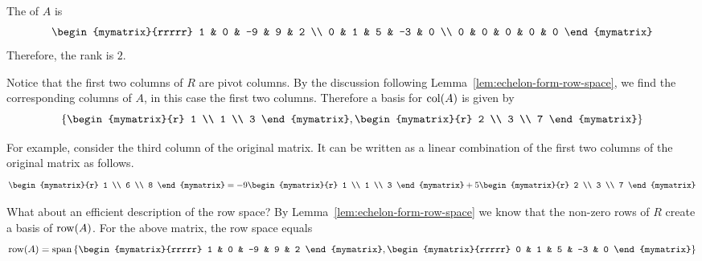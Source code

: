 \begin{solution}
  The {\rref} of $A$ is
  \begin{equation*}
    \begin{mymatrix}{rrrrr}
      1 & 0 & -9 & 9 & 2 \\
      0 & 1 & 5 & -3 & 0 \\
      0 & 0 & 0 & 0 & 0
    \end{mymatrix}
  \end{equation*}
  Therefore, the rank is $2$.

  Notice that the first two columns of $R$ are pivot columns. By the
  discussion following Lemma~\ref{lem:echelon-form-row-space}, we find
  the corresponding columns of $A$, in this case the first two
  columns. Therefore a basis for $\col(A)$ is given by
  \begin{equation*}
    \set{\begin{mymatrix}{r}
        1 \\
        1 \\
        3
      \end{mymatrix} , \begin{mymatrix}{r}
        2 \\
        3 \\
        7
      \end{mymatrix}
    }
  \end{equation*}

  For example, consider the third column of the original matrix. It
  can be written as a linear combination of the first two columns of
  the original matrix as follows.
  \begin{equation*}
    \begin{mymatrix}{r}
      1 \\
      6 \\
      8
    \end{mymatrix} =-9\begin{mymatrix}{r}
      1 \\
      1 \\
      3
    \end{mymatrix} +5\begin{mymatrix}{r}
      2 \\
      3 \\
      7
    \end{mymatrix}
  \end{equation*}

  What about an efficient description of the row space? By
  Lemma~\ref{lem:echelon-form-row-space} we know that the non-zero
  rows of $R$ create a basis of $\row(A)$.  For the above
  matrix, the row space equals
  \begin{equation*}
    \row(A) =
    \sspan \set{
      \begin{mymatrix}{rrrrr}
        1 & 0 & -9 & 9 & 2
      \end{mymatrix}, \begin{mymatrix}{rrrrr}
        0 & 1 & 5 & -3 & 0
      \end{mymatrix}
    }
  \end{equation*}
\end{solution}

